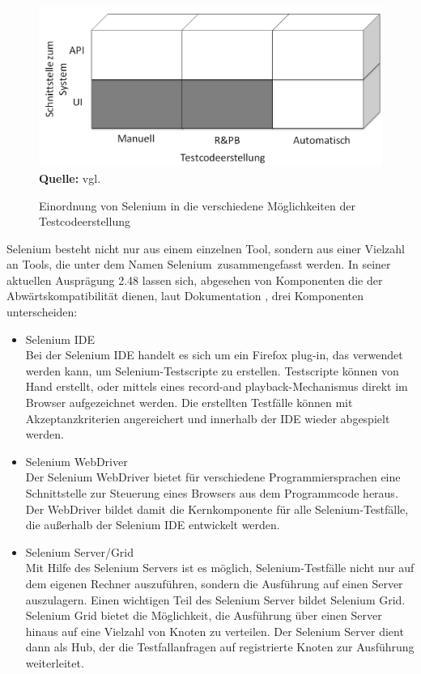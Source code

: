 \begin{figure}[htb]
  \centering  
  \includegraphics[scale=0.7]{img/bereicheTestcodeerstellungSelenium.png}\\
  \footnotesize\sffamily\textbf{Quelle:} vgl. \cite{meszaros_agile_2003}
  \caption{Einordnung von Selenium in die verschiedene Möglichkeiten der Testcodeerstellung}
  \label{fig:bereicheTestcodeerstellungSelenium}
\end{figure}

Selenium besteht nicht nur aus einem einzelnen Tool, sondern aus einer Vielzahl an Tools, die unter dem Namen \grq Selenium\grq\ zusammengefasst werden.
In seiner aktuellen Ausprägung 2.48 lassen sich, abgesehen von Komponenten die der Abwärtskompatibilität dienen, laut Dokumentation \cite{selenium_selenium_2015-1}, drei Komponenten unterscheiden:

\begin{itemize}
\item Selenium IDE \\
Bei der Selenium IDE handelt es sich um ein Firefox plug-in, das verwendet werden kann, um Selenium-Testscripte zu erstellen. Testscripte können von Hand erstellt, oder mittels eines \grq record-and playback\grq -Mechanismus direkt im Browser aufgezeichnet werden. Die erstellten Testfälle können mit Akzeptanzkriterien angereichert und innerhalb der IDE wieder abgespielt werden.
\item Selenium WebDriver \\
Der Selenium WebDriver bietet für verschiedene Programmiersprachen eine Schnittstelle zur Steuerung eines Browsers aus dem Programmcode heraus. Der WebDriver bildet damit die Kernkomponente für alle Selenium-Testfälle, die außerhalb der Selenium IDE entwickelt werden.

\item Selenium Server/Grid \\
Mit Hilfe des Selenium Servers ist es möglich, Selenium-Testfälle nicht nur auf dem eigenen Rechner auszuführen, sondern die Ausführung auf einen Server auszulagern. Einen wichtigen Teil des Selenium Server bildet Selenium Grid. Selenium Grid bietet die Möglichkeit, die Ausführung über einen Server hinaus auf eine Vielzahl von Knoten zu verteilen. Der Selenium Server dient dann als Hub, der die Testfallanfragen auf registrierte Knoten zur Ausführung weiterleitet. 
\end{itemize}


